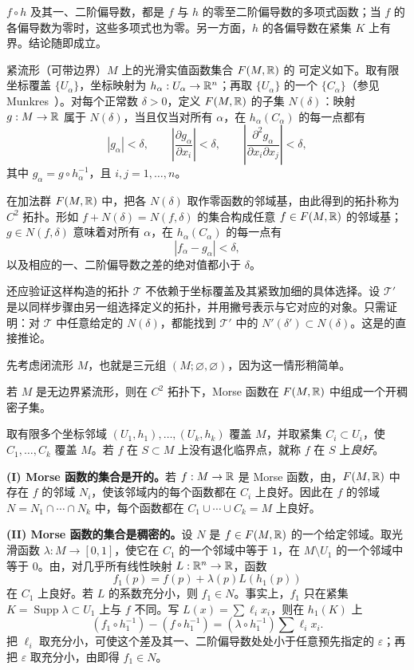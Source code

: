 \Proof $f\circ h$ 及其一、二阶偏导数，都是 $f$ 与 $h$ 的零至二阶偏导数的多项式函数；当 $f$ 的各偏导数为零时，这些多项式也为零。另一方面，$h$ 的各偏导数在紧集 $K$ 上有界。结论随即成立。
\EndProof

紧流形（可带边界）$M$ 上的光滑实值函数集合 $F(M,\mathbb{R})$ 的 可定义如下。取有限坐标覆盖 $\{U_\alpha\}$，坐标映射为 $h_\alpha:U_\alpha\to\mathbb{R}^n$；再取 $\{U_\alpha\}$ 的一个 $\{C_\alpha\}$（参见 Munkres~\cite[p.~7]{ref05}）。对每个正常数 $\delta>0$，定义 $F(M,\mathbb{R})$ 的子集 $N(\delta)$：映射 $g:M\to\mathbb{R}$ 属于 $N(\delta)$，当且仅当对所有 $\alpha$，在 $h_\alpha(C_\alpha)$ 的每一点都有
\[
 |g_\alpha|<\delta,\qquad
 \left|\frac{\partial g_\alpha}{\partial x_i}\right|<\delta,\qquad
 \left|\frac{\partial^2g_\alpha}{\partial x_i\partial x_j}\right|<\delta,
 \tag{$\star$}
\]
其中 $g_\alpha=g\circ h_\alpha^{-1}$，且 $i,j=1,\ldots,n$。

在加法群 $F(M,\mathbb{R})$ 中，把各 $N(\delta)$ 取作零函数的邻域基，由此得到的拓扑称为 $C^2$ 拓扑。形如 $f+N(\delta)=N(f,\delta)$ 的集合构成任意 $f\in F(M,\mathbb{R})$ 的邻域基；$g\in N(f,\delta)$ 意味着对所有 $\alpha$，在 $h_\alpha(C_\alpha)$ 的每一点有
\[
 |f_\alpha-g_\alpha|<\delta,
\]
以及相应的一、二阶偏导数之差的绝对值都小于 $\delta$。

还应验证这样构造的拓扑 $\mathcal T$ 不依赖于坐标覆盖及其紧致加细的具体选择。设 $\mathcal T'$ 是以同样步骤由另一组选择定义的拓扑，并用撇号表示与它对应的对象。只需证明：对 $\mathcal T$ 中任意给定的 $N(\delta)$，都能找到 $\mathcal T'$ 中的 $N'(\delta')\subset N(\delta)$。这是的直接推论。

先考虑闭流形 $M$，也就是三元组 $(M;\varnothing,\varnothing)$，因为这一情形稍简单。

若 $M$ 是无边界紧流形，则在 $C^2$ 拓扑下，Morse 函数在 $F(M,\mathbb{R})$ 中组成一个开稠密子集。

\Proof 取有限多个坐标邻域 $(U_1,h_1),\ldots,(U_k,h_k)$ 覆盖 $M$，并取紧集 $C_i\subset U_i$，使 $C_1,\ldots,C_k$ 覆盖 $M$。若 $f$ 在 $S\subset M$ 上没有退化临界点，就称 $f$ 在 $S$ 上\emph{良好}。

\textbf{(I) Morse 函数的集合是开的。}若 $f:M\to\mathbb{R}$ 是 Morse 函数，由，$F(M,\mathbb{R})$ 中存在 $f$ 的邻域 $N_i$，使该邻域内的每个函数都在 $C_i$ 上良好。因此在 $f$ 的邻域 $N=N_1\cap\cdots\cap N_k$ 中，每个函数都在 $C_1\cup\cdots\cup C_k=M$ 上良好。

\textbf{(II) Morse 函数的集合是稠密的。}设 $N$ 是 $f\in F(M,\mathbb{R})$ 的一个给定邻域。取光滑函数 $\lambda:M\to[0,1]$，使它在 $C_1$ 的一个邻域中等于 $1$，在 $M\setminus U_1$ 的一个邻域中等于 $0$。由，对几乎所有线性映射 $L:\mathbb{R}^n\to\mathbb{R}$，函数
\[
  f_1(p)=f(p)+\lambda(p)L(h_1(p))
\]
在 $C_1$ 上良好。若 $L$ 的系数充分小，则 $f_1\in N$。事实上，$f_1$ 只在紧集 $K=\operatorname{Supp}\lambda\subset U_1$ 上与 $f$ 不同。写 $L(x)=\sum\ell_i x_i$，则在 $h_1(K)$ 上
\[
 (f_1\circ h_1^{-1})-(f\circ h_1^{-1})
 = (\lambda\circ h_1^{-1})\sum\ell_i x_i.
\]
把 $\ell_i$ 取充分小，可使这个差及其一、二阶偏导数处处小于任意预先指定的 $\varepsilon$；再把 $\varepsilon$ 取充分小，由即得 $f_1\in N$。

